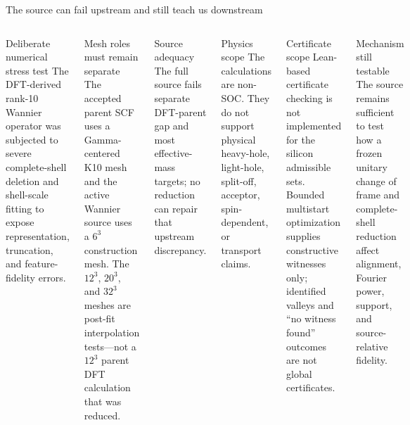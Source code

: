\documentclass[aspectratio=169,10pt]{beamer}
\begin{document}
\begin{frame}{The source can fail upstream and still teach us downstream}
  \begin{columns}[T,onlytextwidth]
      \begin{block}{Deliberate numerical stress test}
        \scriptsize
        The DFT-derived rank-10 Wannier operator was subjected to severe complete-shell
        deletion and shell-scale fitting to expose representation, truncation, and
        feature-fidelity errors.
      \end{block}
      \begin{exampleblock}{Mesh roles must remain separate}
        \scriptsize
        The accepted parent SCF uses a Gamma-centered K10 mesh and the active Wannier
        source uses a $6^3$ construction mesh. The $12^3$, $20^3$, and $32^3$ meshes are
        post-fit interpolation tests---not a $12^3$ parent DFT calculation that was
        reduced.
      \end{exampleblock}
      \begin{alertblock}{Source adequacy}
        \scriptsize
        The full source fails separate DFT-parent gap and most effective-mass targets;
        no reduction can repair that upstream discrepancy.
      \end{alertblock}

      \begin{block}{Physics scope}
        \scriptsize
        The calculations are non-SOC. They do not support physical heavy-hole,
        light-hole, split-off, acceptor, spin-dependent, or transport claims.
      \end{block}
      \begin{alertblock}{Certificate scope}
        \scriptsize
        Lean-based certificate checking is not implemented for the silicon admissible
        sets. Bounded multistart optimization supplies constructive witnesses only;
        identified valleys and ``no witness found'' outcomes are not global certificates.
      \end{alertblock}
      \begin{exampleblock}{Mechanism still testable}
        \scriptsize
        The source remains sufficient to test how a frozen unitary change of frame and
        complete-shell reduction affect alignment, Fourier power, support, and
        source-relative fidelity.
      \end{exampleblock}
  \end{columns}
\end{frame}
\end{document}
